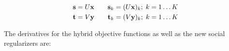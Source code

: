 \begin{align*}
\mathbf{s} & = U \mathbf{x} \qquad \mathbf{s}_{k} = (U \mathbf{x})_{k}; \; k=1\ldots K\\
\mathbf{t} & = V \mathbf{y} \qquad \mathbf{t}_{k} = (V \mathbf{y})_{k}; \; k=1\ldots K
\end{align*}

The derivatives for the hybrid objective functions as well as the new social regularizers are:

\begin{itemize}

\end{itemize}
